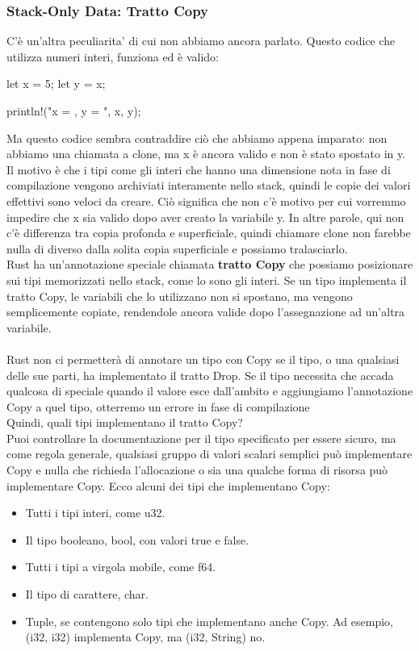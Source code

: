 \documentclass[11pt,a4paper]{article}
\begin{document}
{\subsubsection{Stack-Only Data: Tratto Copy}
C’è un’altra peculiarita' di cui non abbiamo ancora parlato. Questo codice che utilizza numeri interi, funziona ed è valido:

\begin{rust}
    let x = 5;
    let y = x;

    println!("x = {}, y = {}", x, y);
\end{rust}
Ma questo codice sembra contraddire ciò che abbiamo appena imparato: non abbiamo una chiamata a clone, ma x è ancora valido e non è stato spostato in y.\\
Il motivo è che i tipi come gli interi che hanno una dimensione nota in fase di compilazione vengono archiviati interamente nello stack, quindi le copie dei valori effettivi sono veloci da creare. Ciò significa che non c'è motivo per cui vorremmo impedire che x sia valido dopo aver creato la variabile y. In altre parole, qui non c'è differenza tra copia profonda e superficiale, quindi chiamare clone non farebbe nulla di diverso dalla solita copia superficiale e possiamo tralasciarlo.\\
Rust ha un'annotazione speciale chiamata \textbf{tratto Copy} che possiamo posizionare sui tipi memorizzati nello stack, come lo sono gli interi. Se un tipo implementa il tratto Copy, le variabili che lo utilizzano non si spostano, ma vengono semplicemente copiate, rendendole ancora valide dopo l'assegnazione ad un'altra variabile.\\
\\
Rust non ci permetterà di annotare un tipo con Copy se il tipo, o una qualsiasi delle sue parti, ha implementato il tratto Drop. Se il tipo necessita che accada qualcosa di speciale quando il valore esce dall'ambito e aggiungiamo l'annotazione Copy a quel tipo, otterremo un errore in fase di compilazione\\
Quindi, quali tipi implementano il tratto Copy?\\
Puoi controllare la documentazione per il tipo specificato per essere sicuro, ma come regola generale, qualsiasi gruppo di valori scalari semplici può implementare Copy e nulla che richieda l'allocazione o sia una qualche forma di risorsa può implementare Copy. Ecco alcuni dei tipi che implementano Copy:
\begin{itemize}
\item Tutti i tipi interi, come u32.
\item Il tipo booleano, bool, con valori true e false.
\item Tutti i tipi a virgola mobile, come f64.
\item Il tipo di carattere, char.
\item Tuple, se contengono solo tipi che implementano anche Copy. Ad esempio, (i32, i32) implementa Copy, ma (i32, String) no.
\end{itemize}

}
\end{document}

